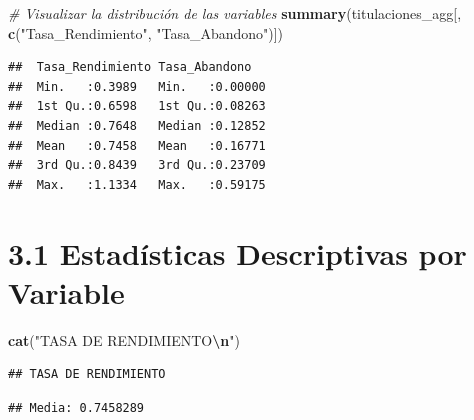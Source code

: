 \documentclass[
]{article}
\newenvironment{Shaded}{\begin{snugshade}}{\end{snugshade}}
\newcommand{\CommentTok}[1]{\textcolor[rgb]{0.56,0.35,0.01}{\textit{#1}}}
\newcommand{\FunctionTok}[1]{\textcolor[rgb]{0.13,0.29,0.53}{\textbf{#1}}}
\newcommand{\NormalTok}[1]{#1}
\newcommand{\SpecialCharTok}[1]{\textcolor[rgb]{0.81,0.36,0.00}{\textbf{#1}}}
\newcommand{\StringTok}[1]{\textcolor[rgb]{0.31,0.60,0.02}{#1}}
\begin{document}
\begin{Shaded}
\begin{Highlighting}[]
\CommentTok{\# Visualizar la distribución de las variables}
\FunctionTok{summary}\NormalTok{(titulaciones\_agg[, }\FunctionTok{c}\NormalTok{(}\StringTok{"Tasa\_Rendimiento"}\NormalTok{, }\StringTok{"Tasa\_Abandono"}\NormalTok{)])}
\end{Highlighting}
\end{Shaded}

\begin{verbatim}
##  Tasa_Rendimiento Tasa_Abandono    
##  Min.   :0.3989   Min.   :0.00000  
##  1st Qu.:0.6598   1st Qu.:0.08263  
##  Median :0.7648   Median :0.12852  
##  Mean   :0.7458   Mean   :0.16771  
##  3rd Qu.:0.8439   3rd Qu.:0.23709  
##  Max.   :1.1334   Max.   :0.59175
\end{verbatim}

\section{3.1 Estadísticas Descriptivas por
Variable}\label{estaduxedsticas-descriptivas-por-variable}

\begin{Shaded}
\begin{Highlighting}[]
\FunctionTok{cat}\NormalTok{(}\StringTok{"TASA DE RENDIMIENTO}\SpecialCharTok{\textbackslash{}n}\StringTok{"}\NormalTok{)}
\end{Highlighting}
\end{Shaded}

\begin{verbatim}
## TASA DE RENDIMIENTO
\end{verbatim}

\begin{Shaded}
\end{Shaded}

\begin{verbatim}
## Media: 0.7458289
\end{verbatim}

\begin{Shaded}
\end{Shaded}
\end{document}
